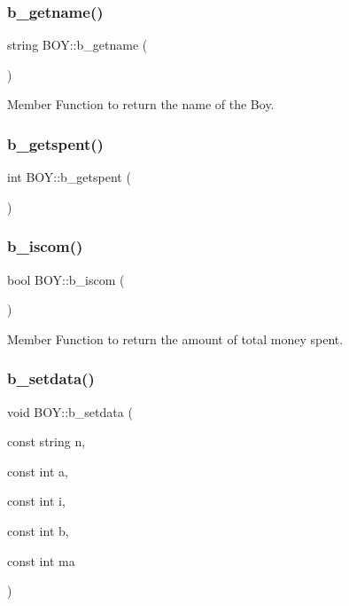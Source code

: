 \subsubsection{\texorpdfstring{b\+\_\+getname()}{b\_getname()}}
{\footnotesize\ttfamily string B\+O\+Y\+::b\+\_\+getname (\begin{DoxyParamCaption}{ }\end{DoxyParamCaption})}



Member Function to return the name of the Boy. 

\mbox{\label{class_b_o_y_ae37d20080792ee3ccb4249431fc5e6a6}} 
\subsubsection{\texorpdfstring{b\+\_\+getspent()}{b\_getspent()}}
{\footnotesize\ttfamily int B\+O\+Y\+::b\+\_\+getspent (\begin{DoxyParamCaption}{ }\end{DoxyParamCaption})}

\mbox{\label{class_b_o_y_a3ca1bdc662f17f4d25c1faec837d277d}} 
\subsubsection{\texorpdfstring{b\+\_\+iscom()}{b\_iscom()}}
{\footnotesize\ttfamily bool B\+O\+Y\+::b\+\_\+iscom (\begin{DoxyParamCaption}{ }\end{DoxyParamCaption})}



Member Function to return the amount of total money spent. 

\mbox{\label{class_b_o_y_a1f1f8342be4bedc55ac72e2af0e13bce}} 
\subsubsection{\texorpdfstring{b\+\_\+setdata()}{b\_setdata()}}
{\footnotesize\ttfamily void B\+O\+Y\+::b\+\_\+setdata (\begin{DoxyParamCaption}\item[{const string}]{n,  }\item[{const int}]{a,  }\item[{const int}]{i,  }\item[{const int}]{b,  }\item[{const int}]{ma }\end{DoxyParamCaption})}



